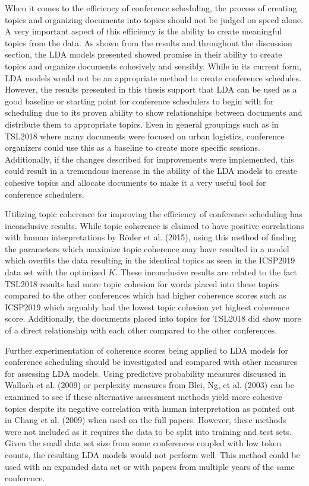 \documentclass[a4paper, 12pt, twoside]{article}
\numberwithin{equation}{section} %
\begin{document}
When it comes to the efficiency of conference scheduling, the process of creating topics and organizing documents into topics should not be judged on speed alone. A very important aspect of this efficiency is the ability to create meaningful topics from the data. As shown from the results and throughout the discussion section, the LDA models presented showed promise in their ability to create topics and organize documents cohesively and sensibly. While in its current form, LDA models would not be an appropriate method to create conference schedules. However, the results presented in this thesis support that LDA can be used as a good baseline or starting point for conference schedulers to begin with for scheduling due to its proven ability to show relationships between documents and distribute them to appropriate topics. Even in general groupings such as in TSL2018 where many documents were focused on urban logistics, conference organizers could use this as a baseline to create more specific sessions. Additionally, if the changes described for improvements were implemented, this could result in a tremendous increase in the ability of the LDA models to create cohesive topics and allocate documents to make it a very useful tool for conference schedulers. 

Utilizing topic coherence for improving the efficiency of conference scheduling has inconclusive results. While topic coherence is claimed to have positive correlations with human interpretations by Röder et al. (2015), using this method of finding the parameters which maximize topic coherence may have resulted in a model which overfits the data resulting in the identical topics as seen in the ICSP2019 data set with the optimized $K$. These inconclusive results are related to the fact TSL2018 results had more topic cohesion for words placed into these topics compared to the other conferences which had higher coherence scores such as ICSP2019 which arguably had the lowest topic cohesion yet highest coherence score. Additionally, the documents placed into topics for TSL2018 did show more of a direct relationship with each other compared to the other conferences.  

Further experimentation of coherence scores being applied to LDA models for conference scheduling should be investigated and compared with other measures for assessing LDA models. Using predictive probability measures discussed in Wallach et al. (2009) or perplexity measures from Blei, Ng, et al. (2003) can be examined to see if these alternative assessment methods yield more cohesive topics despite its negative correlation with human interpretation as pointed out in Chang et al. (2009) when used on the full papers. However, these methods were not included as it requires the data to be split into training and test sets. Given the small data set size from some conferences coupled with low token counts, the resulting LDA models would not perform well. This method could be used with an expanded data set or with papers from multiple years of the same conference.
\end{document}
